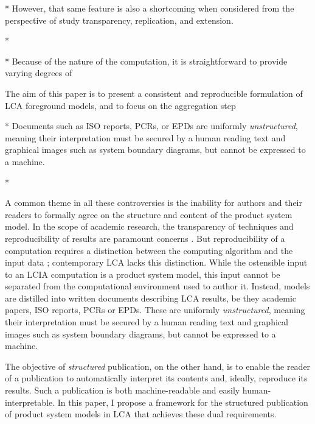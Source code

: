 
 * However, that same feature is also a shortcoming when considered from the perspective of study transparency, replication, and extension.  


 * 

 * Because of the nature of the computation, it is straightforward to provide varying degrees of 

The aim of this paper is to present a consistent and reproducible formulation of LCA foreground models, and to focus on the aggregation step 








 * Documents such as ISO reports, PCRs, or EPDs are uniformly \textit{unstructured}, meaning their interpretation must be secured by a human reading text and graphical images such as system boundary diagrams, but cannot be expressed to a machine.  

 * 


\oldinput

A common theme in all these controversies is the inability for authors and their readers to formally agree on the structure and content of the product system model.  In the scope of academic research, the transparency of techniques and reproducibility of results are paramount concerns \citep{Mesirov_2010}.  But reproducibility of a computation requires a distinction between the computing algorithm and the input data \citep{Buckheit_1995, Fomel_2009}; contemporary LCA lacks this distinction.  While the ostensible input to an LCIA computation is a product system model, this input cannot be separated from the computational environment used to author it.  Instead, models are distilled into written documents describing LCA results, be they academic papers, ISO reports, PCRs or EPDs.  These are uniformly \textit{unstructured}, meaning their interpretation must be secured by a human reading text and graphical images such as system boundary diagrams, but cannot be expressed to a machine.  

The objective of \textit{structured} publication, on the other hand, is to enable the reader of a publication to automatically interpret its contents and, ideally, reproduce its results.  Such a publication is both machine-readable and easily human-interpretable.  In this paper, I propose a framework for the structured publication of product system models in LCA that achieves these dual requirements.  


\cruft




